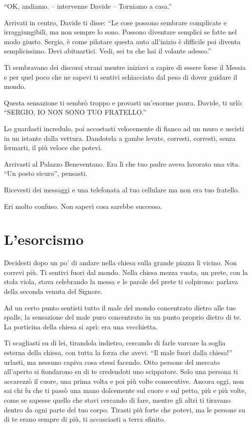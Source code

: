 “OK, andiamo. -- intervenne Davide -- Torniamo a casa.”

Arrivati in centro, Davide ti disse: “Le cose possono sembrare complicate e irraggiungibili, ma non sempre lo sono. Possono diventare semplici se fatte nel modo giusto. Sergio, è come pilotare questa auto all'inizio è difficile poi diventa semplicissimo. Devi abituartici. Vedi, sei tu che hai il volante adesso.”

Ti sembravano dei discorsi strani mentre iniziavi a capire di essere forse il Messia e per quel poco che ne sapevi ti sentivi schiacciato dal peso di dover guidare il mondo.

Questa sensazione ti sembrò troppo e provasti un'enorme paura. Davide, ti urlò: “SERGIO, IO NON SONO TUO FRATELLO.”

Lo guardasti incredulo, poi accostasti velocemente di fianco ad un muro e uscisti in un istante dalla vettura. Dandotela a gambe levate, corresti, corresti, senza fermarti, il più veloce che potevi.

Arrivasti al Palazzo Beneventano. Era lì che tuo padre aveva lavorato una vita. “Un posto sicuro”, pensasti.

Ricevesti dei messaggi e una telefonata al tuo cellulare ma non era tuo fratello.

Eri molto confuso. Non sapevi cosa sarebbe successo.

\section{L'esorcismo}
\label{esorcismo}

Decidesti dopo un po' di andare nella chiesa sulla grande piazza lì vicino. Non correvi più. Ti sentivi fuori dal mondo. Nella chiesa mezza vuota, un prete, con la stola viola, stava celebrando la messa e le parole del prete ti colpirono: parlava della seconda venuta del Signore.

Ad un certo punto sentisti tutto il male del mondo concentrato dietro alle tue spalle, la sensazione del male puro concentrato in un punto proprio dietro di te. La porticina della chiesa si aprì: era una vecchietta.

Ti scagliasti su di lei, tirandola indietro, cercando di farle varcare la soglia esterna della chiesa, con tutta la forza che avevi. “Il male fuori dalla chiesa!” urlasti, ma nessuno capiva cosa stessi facendo. Otto persone del mercato all'aperto si fiondarono su di te credendoti uno scippatore. Solo una persona ti accarezzò il cuore, una prima volta e poi più volte consecutive. Ancora oggi, non sai chi fu che ti passò una mano dolcemente sul cuore e sul petto, più e più volte, come se sapesse quello che stavi cercando di fare, mentre gli altri ti tiravano dentro da ogni parte del tuo corpo. Tirasti più forte che potevi, ma le persone su di te erano sempre di più, ti accasciasti a terra sfinito.

